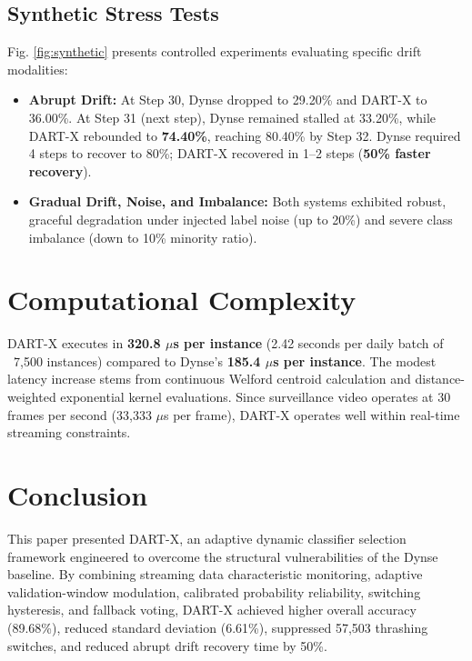 \documentclass[conference,10pt]{IEEEtran}
\begin{document}
\subsection{Synthetic Stress Tests}
Fig. \ref{fig:synthetic} presents controlled experiments evaluating specific drift modalities:
\begin{itemize}
    \item \textbf{Abrupt Drift:} At Step 30, Dynse dropped to 29.20\% and DART-X to 36.00\%. At Step 31 (next step), Dynse remained stalled at 33.20\%, while DART-X rebounded to \textbf{74.40\%}, reaching 80.40\% by Step 32. Dynse required 4 steps to recover to 80\%; DART-X recovered in 1--2 steps (\textbf{50\% faster recovery}).
    \item \textbf{Gradual Drift, Noise, and Imbalance:} Both systems exhibited robust, graceful degradation under injected label noise (up to 20\%) and severe class imbalance (down to 10\% minority ratio).
\end{itemize}

\section{Computational Complexity}
DART-X executes in \textbf{320.8 $\mu$s per instance} (2.42 seconds per daily batch of ~7,500 instances) compared to Dynse's \textbf{185.4 $\mu$s per instance}. The modest latency increase stems from continuous Welford centroid calculation and distance-weighted exponential kernel evaluations. Since surveillance video operates at 30 frames per second (33,333 $\mu$s per frame), DART-X operates well within real-time streaming constraints.

\section{Conclusion}
This paper presented DART-X, an adaptive dynamic classifier selection framework engineered to overcome the structural vulnerabilities of the Dynse baseline. By combining streaming data characteristic monitoring, adaptive validation-window modulation, calibrated probability reliability, switching hysteresis, and fallback voting, DART-X achieved higher overall accuracy (89.68\%), reduced standard deviation (6.61\%), suppressed 57,503 thrashing switches, and reduced abrupt drift recovery time by 50\%.

\balance


\end{document}
